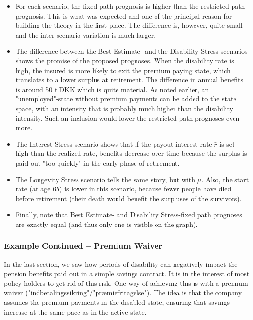 \documentclass{article}
\newcommand{\1}[1]{\mathbbm{1}_{\left\lbrace #1 \right\rbrace}}
\theoremstyle{break}
\theoremstyle{remark}
\numberwithin{equation}{section}
\begin{document}
\begin{itemize}
	\item For each scenario, the fixed path prognosis is higher than the restricted path prognosis. This is what was expected and one of the principal reason for building the theory in the first place. The difference is, however, quite small -- and the inter-scenario variation is much larger.
	\item The difference between the Best Estimate- and the Disability Stress-scenarios shows the promise of the proposed prognoses. When the disability rate is high, the insured is more likely to exit the premium paying state, which translates to a lower surplus at retirement. The difference in annual benefits is around 50 t.DKK which is quite material. As noted earlier, an "unemployed"-state without premium payments can be added to the state space, with an intensity that is probably much higher than the disability intensity. Such an inclusion would lower the restricted path prognoses even more.
	\item The Interest Stress scenario shows that if the payout interest rate $\bar{r}$ is set high than the realized rate, benefits decrease over time because the surplus is paid out "too quickly" in the early phase of retirement.
	\item The Longevity Stress scenario tells the same story, but with $\bar{\mu}$. Also, the start rate (at age 65) is lower in this scenario, because fewer people have died before retirement (their death would benefit the surpluses of the survivors).
	\item Finally, note that Best Estimate- and Disability Stress-fixed path prognoses are exactly equal (and thus only one is visible on the graph).
\end{itemize}

\subsubsection{Example Continued -- Premium Waiver} \label{Waiver}

In the last section, we saw how periods of disability can negatively impact the pension benefits paid out in a simple savings contract. It is in the interest of most policy holders to get rid of this risk. One way of achieving this is with a premium waiver ("indbetalingssikring"/"præmiefritagelse"). The idea is that the company assumes the premium payments in the disabled state, ensuring that savings increase at the same pace as in the active state.
\end{document}
